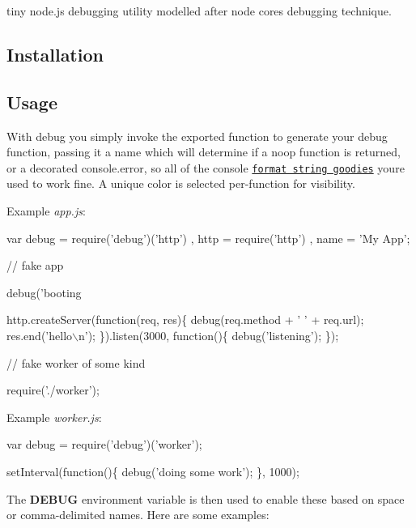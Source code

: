 tiny node.\+js debugging utility modelled after node core\textquotesingle{}s debugging technique.

\subsection*{Installation}




\subsection*{Usage}

With {\ttfamily debug} you simply invoke the exported function to generate your debug function, passing it a name which will determine if a noop function is returned, or a decorated {\ttfamily console.\+error}, so all of the {\ttfamily console} \href{https://developer.chrome.com/devtools/docs/console-api#consolelogobject-object}{\tt format string goodies} you\textquotesingle{}re used to work fine. A unique color is selected per-\/function for visibility.

Example {\itshape app.\+js}\+:


\begin{DoxyCode}
var debug = require('debug')('http')
  , http = require('http')
  , name = 'My App';

// fake app

debug('booting %

http.createServer(function(req, res)\{
  debug(req.method + ' ' + req.url);
  res.end('hello\(\backslash\)n');
\}).listen(3000, function()\{
  debug('listening');
\});

// fake worker of some kind

require('./worker');
\end{DoxyCode}


Example {\itshape worker.\+js}\+:


\begin{DoxyCode}
var debug = require('debug')('worker');

setInterval(function()\{
  debug('doing some work');
\}, 1000);
\end{DoxyCode}


The {\bfseries D\+E\+B\+UG} environment variable is then used to enable these based on space or comma-\/delimited names. Here are some examples\+:





